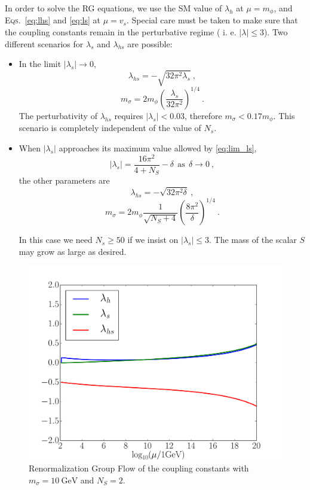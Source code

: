 \documentclass[aps,prd,preprintnumbers,nofootinbibn,twocolumn]{revtex4}
\begin{document}
In order to solve the RG equations, we use the SM value of $\lambda_h$ at $\mu = m_\phi$, and \textsc{Eqs.}\ \eqref{eq:lhs} and \eqref{eq:ls} at $\mu=v_s$. Special care must be taken to make sure that the coupling constants remain in the perturbative regime ( i. e. $|\lambda| \leq 3$). Two different scenarios for $\lambda_s$ and $\lambda_{hs}$ are possible:
\begin{itemize}
\item In the limit $|\lambda_s|\to 0$,
\begin{equation}
\lambda_{hs} = -\sqrt{32\pi^2 \lambda_s}\ ,
\end{equation}
\begin{equation}
m_\sigma = 2 m_\phi \left(\frac{\lambda_s}{32\pi^2}\right)^{1/4}\ .
\end{equation}
The perturbativity of $\lambda_{hs}$ requires $|\lambda_s| < 0.03$, therefore $m_\sigma < 0.17 m_\phi$. This scenario is completely independent of the value of $N_s$.

\item When $|\lambda_s|$ approaches its maximum value allowed by \eqref{eq:lim_ls},
\begin{equation}
|\lambda_s| = \frac{16\pi^2}{4+N_S} - \delta \ \ \mathrm{as}\ \ \delta\to 0\ ,
\end{equation}
the other parameters are
\begin{equation}
\lambda_{hs} = -\sqrt{32\pi^2 \delta}\ ,
\end{equation}
\begin{equation}
m_\sigma = 2 m_\phi \frac{1}{\sqrt{N_S + 4 }}\left(\frac{8\pi^2}{\delta}\right)^{1/4}\ .
\end{equation}

In this case we need $N_s \geq 50$ if we insist on $|\lambda_s| \leq 3$. The mass of the scalar $S$ may grow as large as desired.
\end{itemize}

\begin{figure}[t]
\centering
\includegraphics[width=\columnwidth]{scenario2}
\caption{Renormalization Group Flow of the coupling constants with $m_\sigma = \SI{10}{\giga\electronvolt}$ and $N_S=2$.}\label{fig:sce2}
\end{figure}
\end{document}
